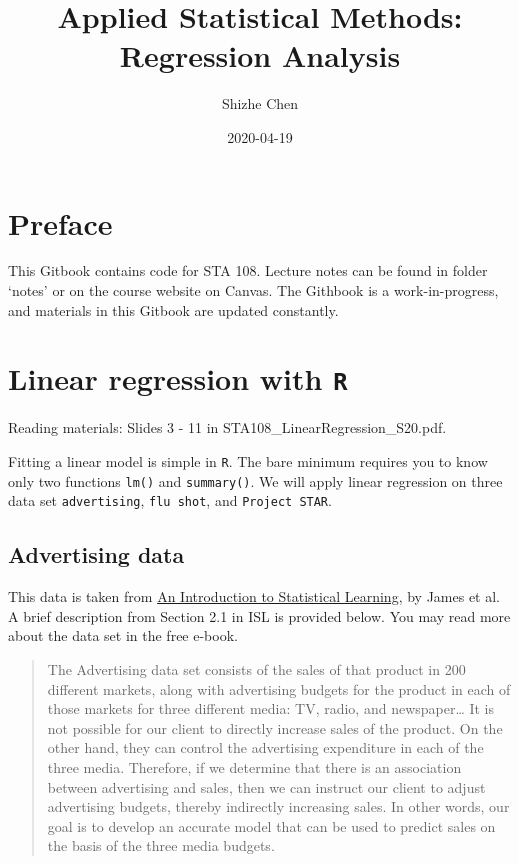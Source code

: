 \documentclass[12pt,]{book}
\title{Applied Statistical Methods: Regression Analysis}
\author{Shizhe Chen}
\date{2020-04-19}
\begin{document}
\maketitle

{
\setcounter{tocdepth}{1}
\tableofcontents
}
\chapter*{Preface}\label{pre}

This Gitbook contains code for STA 108. Lecture notes can be found in
folder `notes' or on the course website on Canvas. The Githbook is a
work-in-progress, and materials in this Gitbook are updated constantly.

\chapter{\texorpdfstring{Linear regression with
\texttt{R}}{Linear regression with R}}\label{ch:lmR}

Reading materials: Slides 3 - 11 in STA108\_LinearRegression\_S20.pdf.

Fitting a linear model is simple in \texttt{R}. The bare minimum
requires you to know only two functions \texttt{lm()} and
\texttt{summary()}. We will apply linear regression on three data set
\texttt{advertising}, \texttt{flu\ shot}, and \texttt{Project\ STAR}.

\section{Advertising data}\label{advertising-data}

This data is taken from
\href{http://faculty.marshall.usc.edu/gareth-james/ISL/}{An Introduction
to Statistical Learning}, by James et al. A brief description from
Section 2.1 in ISL is provided below. You may read more about the data
set in the free e-book.

\begin{quote}
The Advertising data set consists of the sales of that product in 200
different markets, along with advertising budgets for the product in
each of those markets for three different media: TV, radio, and
newspaper\ldots{} It is not possible for our client to directly increase
sales of the product. On the other hand, they can control the
advertising expenditure in each of the three media. Therefore, if we
determine that there is an association between advertising and sales,
then we can instruct our client to adjust advertising budgets, thereby
indirectly increasing sales. In other words, our goal is to develop an
accurate model that can be used to predict sales on the basis of the
three media budgets.
\end{quote}
\end{document}
